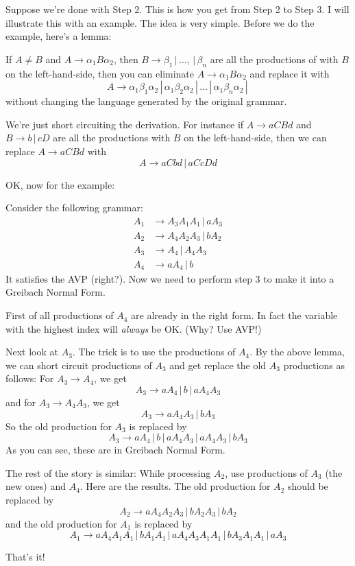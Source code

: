Suppose we're done with Step 2. This is how you get from Step 2 to
Step 3. I will illustrate this with an example. The idea is very
simple. Before we do the example, here's a lemma:

\begin{lem} If $A \neq B$ and $A \rightarrow \alpha_1 B \alpha_2$,
then $B \rightarrow \beta_1 \,|\, \ldots, \,|\, \beta_n$ are all
the productions of with $B$ on the left-hand-side, then you can
eliminate $A \rightarrow \alpha_1 B \alpha_2$ and replace it with
\[
A \rightarrow \alpha_1 \beta_1 \alpha_2 \,|\,
 \alpha_1 \beta_2 \alpha_2 \,|\, \ldots \,|\,
 \alpha_1 \beta_n \alpha_2 \,|\,
\]
without changing the language generated by the original grammar.
\end{lem}

We're just short circuiting the derivation. For instance if $A
\rightarrow aCBd$ and $B \rightarrow b \,|\, cD$ are all the
productions with $B$ on the left-hand-side, then we can replace $A
\rightarrow aCBd$ with
\[
 A \rightarrow aCbd \,|\, aCcDd
\]

OK, now for the example:

\begin{eg}
Consider the following grammar:
\begin{align*}
 A_1 &\rightarrow A_3 A_1A_1 \,|\, aA_3 \\
 A_2 &\rightarrow A_4A_2A_3 \,|\, bA_2 \\
 A_3 &\rightarrow A_4 \,|\, A_4 A_3 \\
 A_4 &\rightarrow aA_4 \,|\, b
\end{align*}
It satisfies the AVP (right?). Now we need to perform step 3 to
make it into a Greibach Normal Form.

First of all productions of $A_4$ are already in the right form.
In fact the variable with the highest index will \textit{always} be
OK. (Why? Use AVP!)

Next look at $A_3$. The trick is to use the productions of $A_4$.
By the above lemma, we can short circuit productions of $A_3$ and
get replace the old $A_3$ productions as follows: For $A_3
\rightarrow A_4$, we get
\[
 A_3 \rightarrow aA_4 \,|\, b \,|\, a A_4 A_3
\]
and for $A_3\rightarrow A_4A_3$, we get
\[
 A_3 \rightarrow aA_4A_3 \,|\, bA_3
\]
So the old production for $A_3$ is replaced by
\[
 A_3 \rightarrow aA_4 \,|\, b \,|\, a A_4 A_3 \,|\, aA_4A_3 \,|\, bA_3
\]
As you can see, these are in Greibach Normal Form.

The rest of the story is similar: While processing $A_2$, use
productions of $A_3$ (the new ones) and $A_4$. Here are the
results. The old production for $A_2$ should be replaced by
\[
 A_2 \rightarrow aA_4 A_2 A_3 \,|\, b A_2 A_3 \,|\, b A_2
\]
and the old production for $A_1$ is replaced by
\[
 A_1 \rightarrow aA_4 A_1 A_1 \,|\, bA_1 A_1 \,|\, aA_4 A_3 A_1
 A_1 \,|\, bA_3 A_1 A_1 \,|\, a A_3
\]

That's it!
\end{eg}

